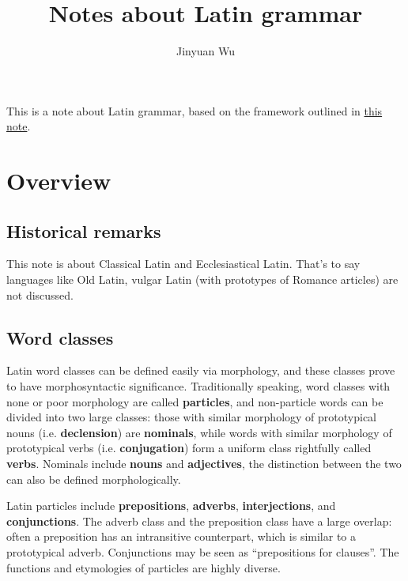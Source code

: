 \documentclass{article}
\title{Notes about Latin grammar}
\author{Jinyuan Wu}
\newcommand*{\concept}[1]{\textbf{#1}}
\newcommand{\general}{\href{../methodology/glossing.pdf}{this note}}
\begin{document}
\maketitle

This is a note about Latin grammar, 
based on the framework outlined in \general.

\section{Overview}

\subsection{Historical remarks}

This note is about Classical Latin and Ecclesiastical Latin.
That's to say languages like Old Latin, vulgar Latin (with prototypes of Romance articles)
are not discussed.


\subsection{Word classes}

Latin word classes can be defined easily via morphology,
and these classes prove to have morphosyntactic significance.
Traditionally speaking, 
word classes with none or poor morphology are called \concept{particles},
and non-particle words can be divided into two large classes:
those with similar morphology of prototypical nouns (i.e. \concept{declension}) are \concept{nominals},
while words with similar morphology of prototypical verbs (i.e. \concept{conjugation})
form a uniform class rightfully called \concept{verbs}.
Nominals include \concept{nouns} and \concept{adjectives},
the distinction between the two can also be defined morphologically.

Latin particles include \concept{prepositions}, \concept{adverbs},
\concept{interjections}, and \concept{conjunctions}.
The adverb class and the preposition class have a large overlap:
often a preposition has an intransitive counterpart,
which is similar to a prototypical adverb.
Conjunctions may be seen as ``prepositions for clauses''.
The functions and etymologies of particles are highly diverse.
\end{document}
